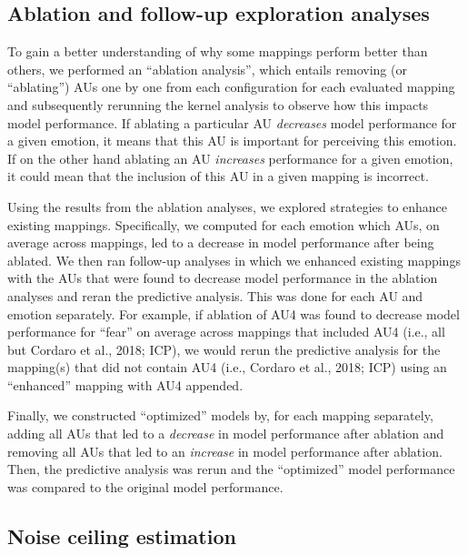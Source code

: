 \documentclass[11pt,american,a4paper,oneside,]{memoir} %
\begin{document}
\hypertarget{ablation-and-follow-up-exploration-analyses}{%
\subsection{Ablation and follow-up exploration analyses}\label{ablation-and-follow-up-exploration-analyses}}

To gain a better understanding of why some mappings perform better than others, we performed an ``ablation analysis'', which entails removing (or ``ablating'') AUs one by one from each configuration for each evaluated mapping and subsequently rerunning the kernel analysis to observe how this impacts model performance. If ablating a particular AU \emph{decreases} model performance for a given emotion, it means that this AU is important for perceiving this emotion. If on the other hand ablating an AU \emph{increases} performance for a given emotion, it could mean that the inclusion of this AU in a given mapping is incorrect.

Using the results from the ablation analyses, we explored strategies to enhance existing mappings. Specifically, we computed for each emotion which AUs, on average across mappings, led to a decrease in model performance after being ablated. We then ran follow-up analyses in which we enhanced existing mappings with the AUs that were found to decrease model performance in the ablation analyses and reran the predictive analysis. This was done for each AU and emotion separately. For example, if ablation of AU4 was found to decrease model performance for ``fear'' on average across mappings that included AU4 (i.e., all but Cordaro et al., 2018; ICP), we would rerun the predictive analysis for the mapping(s) that did not contain AU4 (i.e., Cordaro et al., 2018; ICP) using an ``enhanced'' mapping with AU4 appended.

Finally, we constructed ``optimized'' models by, for each mapping separately, adding all AUs that led to a \emph{decrease} in model performance after ablation and removing all AUs that led to an \emph{increase} in model performance after ablation. Then, the predictive analysis was rerun and the ``optimized'' model performance was compared to the original model performance.

\hypertarget{hka-noise-ceiling}{%
\subsection{Noise ceiling estimation}\label{hka-noise-ceiling}}
\end{document}
